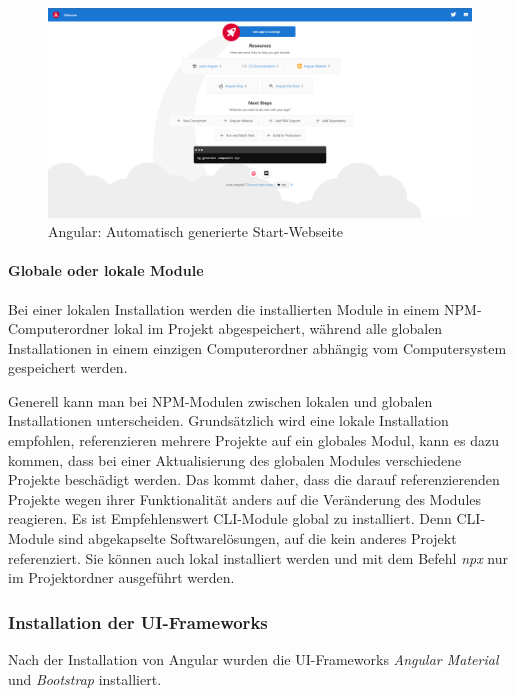 \begin{figure}
    \centering
    \includegraphics[scale=0.25]{pics/AngularStartingPage.png}
    \caption{Angular: Automatisch generierte Start-Webseite}
    \label{fig:impl:angular-starting-page}
\end{figure}

\paragraph{Globale oder lokale Module}
Bei einer lokalen Installation werden die installierten Module in einem NPM-Computerordner lokal im Projekt abgespeichert, während alle globalen Installationen in einem einzigen Computerordner abhängig vom Computersystem gespeichert werden.

Generell kann man bei NPM-Modulen zwischen lokalen und globalen Installationen unterscheiden. Grundsätzlich wird eine lokale Installation empfohlen, referenzieren mehrere Projekte auf ein globales Modul, kann es dazu kommen, dass bei einer Aktualisierung des globalen Modules verschiedene Projekte beschädigt werden.
Das kommt daher, dass die darauf referenzierenden Projekte wegen ihrer Funktionalität anders auf die Veränderung des Modules reagieren.
Es ist Empfehlenswert CLI-Module global zu installiert. Denn CLI-Module sind abgekapselte Softwarelösungen, auf die kein anderes Projekt referenziert. Sie können auch lokal installiert werden und mit dem Befehl \emph{npx} nur im Projektordner ausgeführt werden.\cite{npmlocalorglobal}

\subsubsection{Installation der UI-Frameworks}

Nach der Installation von Angular wurden die UI-Frameworks \emph{Angular Material} und \emph{Bootstrap} installiert. 

